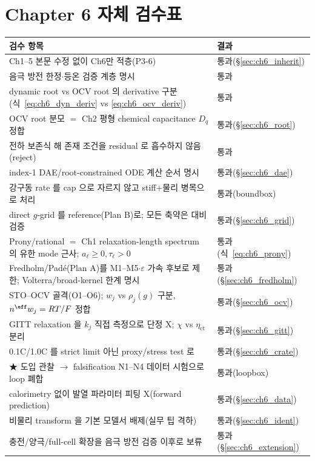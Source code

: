 \section{Chapter 6 자체 검수표}\label{sec:ch6_selfcheck}
{\small
\begin{longtable}{p{} p{}}
\toprule 검수 항목 & 결과 \\ \midrule \endhead
Ch1--5 본문 수정 없이 Ch6만 적층(P3-6) & 통과(\S\ref{sec:ch6_inherit}) \\
음극 방전 한정$\cdot$등온 검증 계층 명시 & 통과 \\
dynamic root vs OCV root 의 derivative 구분(식~\eqref{eq:ch6_dyn_deriv} vs \eqref{eq:ch6_ocv_deriv}) & 통과 \\
OCV root 분모 $=$ Ch2 평형 chemical capacitance $D_q$ 정합 & 통과(\S\ref{sec:ch6_root}) \\
전하 보존식 해 존재 조건을 residual 로 흡수하지 않음(reject) & 통과 \\
index-1 DAE/root-constrained ODE 계산 순서 명시 & 통과(\S\ref{sec:ch6_dae}) \\
강구동 rate 를 cap 으로 자르지 않고 stiff+물리 병목으로 처리 & 통과(boundbox) \\
direct $g$-grid 를 reference(Plan B)로; 모든 축약은 대비 검증 & 통과(\S\ref{sec:ch6_grid}) \\
Prony/rational $=$ Ch1 relaxation-length spectrum 의 유한 mode 근사; $a_\ell\ge0,\tau_\ell>0$ & 통과(식~\eqref{eq:ch6_prony}) \\
Fredholm/Padé(Plan A)를 M1--M5$\cdot\varepsilon$ 가속 후보로 제한; Volterra/broad-kernel 한계 명시 & 통과(\S\ref{sec:ch6_fredholm}) \\
STO--OCV 골격(O1--O6); $w_j$ vs $\rho_j(g)$ 구분, $n^{\eff}w_j=RT/F$ 정합 & 통과(\S\ref{sec:ch6_ocv}) \\
GITT relaxation 을 $k_j$ 직접 측정으로 단정 X; $\chi$ vs $\eta_{\mathrm{ct}}$ 분리 & 통과(\S\ref{sec:ch6_gitt}) \\
0.1C/1.0C 를 strict limit 아닌 proxy/stress test 로 & 통과(\S\ref{sec:ch6_crate}) \\
★ 도입 관찰 $\to$ falsification N1--N4 데이터 시험으로 loop 폐합 & 통과(loopbox) \\
calorimetry 없이 발열 파라미터 피팅 X(forward prediction) & 통과(\S\ref{sec:ch6_data}) \\
비물리 transform 을 기본 모델서 배제(실무 팁 격하) & 통과(\S\ref{sec:ch6_ident}) \\
충전/양극/full-cell 확장을 음극 방전 검증 이후로 보류 & 통과(\S\ref{sec:ch6_extension}) \\
\bottomrule
\end{longtable}
}

